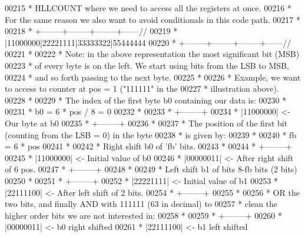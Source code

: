 \begin{DoxyCode}
00215 \textcolor{comment}{ * HLLCOUNT where we need to access all the registers at once.}
00216 \textcolor{comment}{ * For the same reason we also want to avoid conditionals in this code path.}
00217 \textcolor{comment}{ *}
00218 \textcolor{comment}{ * +--------+--------+--------+------//}
00219 \textcolor{comment}{ * |11000000|22221111|33333322|55444444}
00220 \textcolor{comment}{ * +--------+--------+--------+------//}
00221 \textcolor{comment}{ *}
00222 \textcolor{comment}{ * Note: in the above representation the most significant bit (MSB)}
00223 \textcolor{comment}{ * of every byte is on the left. We start using bits from the LSB to MSB,}
00224 \textcolor{comment}{ * and so forth passing to the next byte.}
00225 \textcolor{comment}{ *}
00226 \textcolor{comment}{ * Example, we want to access to counter at pos = 1 ("111111" in the}
00227 \textcolor{comment}{ * illustration above).}
00228 \textcolor{comment}{ *}
00229 \textcolor{comment}{ * The index of the first byte b0 containing our data is:}
00230 \textcolor{comment}{ *}
00231 \textcolor{comment}{ *  b0 = 6 * pos / 8 = 0}
00232 \textcolor{comment}{ *}
00233 \textcolor{comment}{ *   +--------+}
00234 \textcolor{comment}{ *   |11000000|  <- Our byte at b0}
00235 \textcolor{comment}{ *   +--------+}
00236 \textcolor{comment}{ *}
00237 \textcolor{comment}{ * The position of the first bit (counting from the LSB = 0) in the byte}
00238 \textcolor{comment}{ * is given by:}
00239 \textcolor{comment}{ *}
00240 \textcolor{comment}{ *  fb = 6 * pos %
00241 \textcolor{comment}{ *}
00242 \textcolor{comment}{ * Right shift b0 of 'fb' bits.}
00243 \textcolor{comment}{ *}
00244 \textcolor{comment}{ *   +--------+}
00245 \textcolor{comment}{ *   |11000000|  <- Initial value of b0}
00246 \textcolor{comment}{ *   |00000011|  <- After right shift of 6 pos.}
00247 \textcolor{comment}{ *   +--------+}
00248 \textcolor{comment}{ *}
00249 \textcolor{comment}{ * Left shift b1 of bits 8-fb bits (2 bits)}
00250 \textcolor{comment}{ *}
00251 \textcolor{comment}{ *   +--------+}
00252 \textcolor{comment}{ *   |22221111|  <- Initial value of b1}
00253 \textcolor{comment}{ *   |22111100|  <- After left shift of 2 bits.}
00254 \textcolor{comment}{ *   +--------+}
00255 \textcolor{comment}{ *}
00256 \textcolor{comment}{ * OR the two bits, and finally AND with 111111 (63 in decimal) to}
00257 \textcolor{comment}{ * clean the higher order bits we are not interested in:}
00258 \textcolor{comment}{ *}
00259 \textcolor{comment}{ *   +--------+}
00260 \textcolor{comment}{ *   |00000011|  <- b0 right shifted}
00261 \textcolor{comment}{ *   |22111100|  <- b1 left shifted}
}
\end{DoxyCode}
